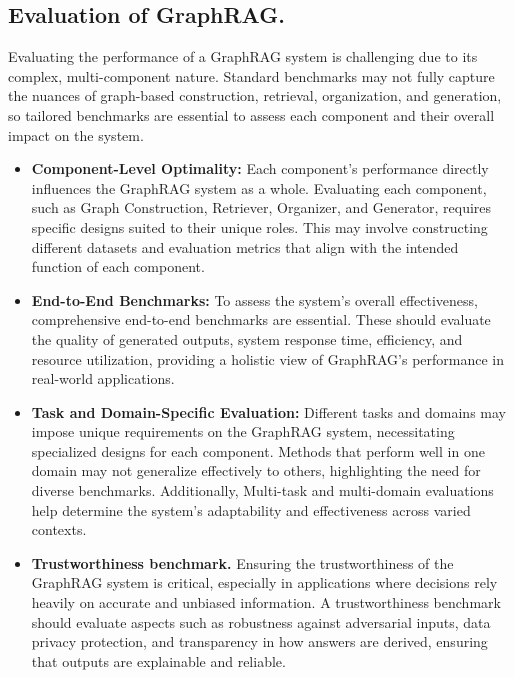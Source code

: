 \begin{itemize}[leftmargin=*]
\begin{itemize}
    \end{itemize}
\end{itemize}

\subsection{ Evaluation of GraphRAG.} Evaluating the performance of a GraphRAG system is challenging due to its complex, multi-component nature. Standard benchmarks may not fully capture the nuances of graph-based construction, retrieval, organization, and generation, so tailored benchmarks are essential to assess each component and their overall impact on the system. \\ 

\begin{itemize}[leftmargin=*]
    \item \textbf{Component-Level Optimality:} Each component’s performance directly influences the GraphRAG system as a whole. Evaluating each component, such as Graph Construction, Retriever, Organizer, and Generator, requires specific designs suited to their unique roles. This may involve constructing different datasets and evaluation metrics that align with the intended function of each component.
    
    \item \textbf{End-to-End Benchmarks:}  To assess the system’s overall effectiveness, comprehensive end-to-end benchmarks are essential. These should evaluate the quality of generated outputs, system response time, efficiency, and resource utilization, providing a holistic view of GraphRAG’s performance in real-world applications.
    
    \item \textbf{Task and Domain-Specific Evaluation:} Different tasks and domains may impose unique requirements on the GraphRAG system, necessitating specialized designs for each component. Methods that perform well in one domain may not generalize effectively to others, highlighting the need for diverse benchmarks. Additionally, Multi-task and multi-domain evaluations help determine the system’s adaptability and effectiveness across varied contexts.
    
    \item \textbf{Trustworthiness benchmark.} Ensuring the trustworthiness of the GraphRAG system is critical, especially in applications where decisions rely heavily on accurate and unbiased information. A trustworthiness benchmark should evaluate aspects such as robustness against adversarial inputs, data privacy protection, and transparency in how answers are derived, ensuring that outputs are explainable and reliable.
\end{itemize}     


